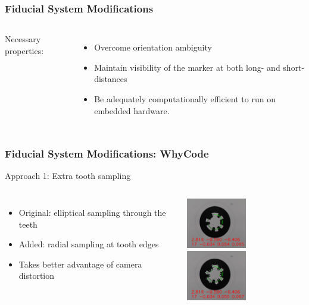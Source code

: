 \documentclass[aspectratio=169]{rubeamer}
\begin{document}
\begin{frame}
  \frametitle{Fiducial System Modifications}
  \begin{columns}
    Necessary properties:
    \begin{itemize}
      \item Overcome orientation ambiguity
      \item Maintain visibility of the marker at both long- and short- distances
      \item Be adequately computationally efficient to run on embedded hardware.
    \end{itemize}
    \centering
  \end{columns}
\end{frame}

\begin{frame}
  \frametitle{Fiducial System Modifications: WhyCode}
  Approach 1: Extra tooth sampling
  \begin{columns}
    \begin{itemize}
      \item Original: elliptical sampling through the teeth
      \item Added: radial sampling at tooth edges
      \item Takes better advantage of camera distortion
    \end{itemize}
    \centering
    \includegraphics[width=0.5\textwidth]{original_sampling}\\
    \includegraphics[width=0.5\textwidth]{ellipse_sampling}\\
  \end{columns}
\end{frame}
\end{document}
